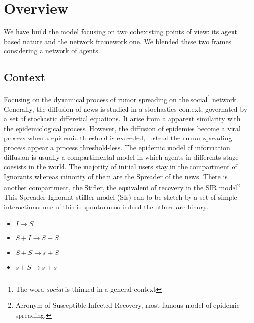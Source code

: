 \documentclass[11pt]{article} %
\begin{document}
\section{Overview}
We have build the model focusing on two cohexisting points of view: its agent based nature and the network framework one. 
We blended these two frames considering a network of agents. 
\subsection{Context}
Focusing on the dynamical process of rumor spreading on the social\footnote{The word \textit{ social} is thinked in a general context} network. Generally, the diffusion of news is studied in a stochastics context, governated by a set of stochastic differetial equations. It arise from a apparent similarity with the epidemiological process. However, the diffusion of epidemies become a viral process when a epidemic threshold is exceeded, instead the rumor spreading process appear a process threshold-less.  The epidemic model of information diffusion is usually a compartimental model in which agents in differents stage coesists in the world.
The majority of initial users stay in the compartment of Ignorants whereas minority of them are the Spreader of the news. There is another compartment, the Stifler, the equivalent of recovery in the SIR model\footnote{Acronym of Susceptible-Infected-Recovery, most famous model of epidemic spreading.}. 
\\ This Spreader-Ignorant-stiffler model (SIs) can to be sketch by a set of simple interactions: one of this is spontanueos indeed the others are binary.
\begin{itemize}
\item$ I \longrightarrow S$
\item $S+I \longrightarrow S + S$

\item $S + S \longrightarrow s + S$

\item $s + S \longrightarrow  s + s$
\end{itemize}
\end{document}
